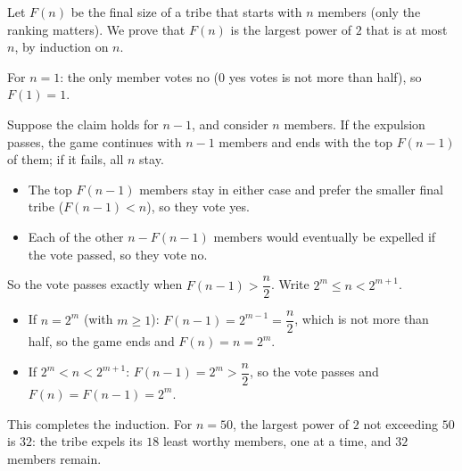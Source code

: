 Let $F(n)$ be the final size of a tribe that starts with $n$ members (only the ranking matters). We prove that $F(n)$ is the largest power of $2$ that is at most $n$, by induction on $n$.

For $n=1$: the only member votes no ($0$ yes votes is not more than half), so $F(1)=1$.

Suppose the claim holds for $n-1$, and consider $n$ members. If the expulsion passes, the game continues with $n-1$ members and ends with the top $F(n-1)$ of them; if it fails, all $n$ stay.
\begin{itemize}
\item The top $F(n-1)$ members stay in either case and prefer the smaller final tribe ($F(n-1)<n$), so they vote yes.
\item Each of the other $n-F(n-1)$ members would eventually be expelled if the vote passed, so they vote no.
\end{itemize}
So the vote passes exactly when $F(n-1)>\dfrac n2$. Write $2^m\le n<2^{m+1}$.
\begin{itemize}
\item If $n=2^m$ (with $m\ge1$): $F(n-1)=2^{m-1}=\dfrac n2$, which is not more than half, so the game ends and $F(n)=n=2^m$.
\item If $2^m<n<2^{m+1}$: $F(n-1)=2^m>\dfrac n2$, so the vote passes and $F(n)=F(n-1)=2^m$.
\end{itemize}
This completes the induction. For $n=50$, the largest power of $2$ not exceeding $50$ is $32$: the tribe expels its $18$ least worthy members, one at a time, and $\boxed{32}$ members remain.

